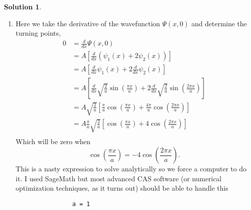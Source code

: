 \documentclass[10pt]{article}
\makeatletter
\theoremstyle{definition}
\newtheorem{soln}{Solution}
\newcommand{\boxspacing}{\kern\kvtcb@left@rule\kern\kvtcb@boxsep}
\newcommand{\prompt}[4]{
    \ttfamily\llap{{\color{#2}[#3]:\hspace{3pt}#4}}\vspace{-\baselineskip}
}
\makeatother
\begin{document}
\begin{soln}
\begin{enumerate}[label=(\alph*)]
\begin{center}
          \end{center}
    \item Here we take the derivative of the wavefunction $\Psi(x,0)$ and determine the turning points,
          \begin{align*}
            0 & =\frac{d}{dx}\Psi(x,0)                                                                                                                         \\
              & =A\left[\frac{d}{dx}(\psi_1(x)+2\psi_2(x))\right]                                                                                              \\
              & =A\left[\frac{d}{dx}\psi_1(x)+2\frac{d}{dx}\psi_2(x)\right]                                                                                    \\
              & =A\left[\frac{d}{dx}\sqrt{\frac{2}{a}}\sin\left(\frac{\pi x}{a}\right)+2\frac{d}{dx}\sqrt{\frac{2}{a}}\sin\left(\frac{2\pi x}{a}\right)\right] \\
              & =A\sqrt{\frac{2}{a}}\left[\frac{\pi}{a}\cos\left(\frac{\pi x}{a}\right)+\frac{4\pi}{a}\cos\left(\frac{2\pi x}{a}\right)\right]                 \\
              & =A\frac{\pi}{a}\sqrt{\frac{2}{a}}\left[\cos\left(\frac{\pi x}{a}\right)+4\cos\left(\frac{2\pi x}{a}\right)\right]                              \\
          \end{align*}
          Which will be zero when
          $$\cos\left(\frac{\pi x}{a}\right)=-4\cos\left(\frac{2\pi x}{a}\right).$$
          This is a nasty expression to solve analytically so we force a computer to do it. I used SageMath but most advanced
          CAS software (or numerical optimization techniques, as it turns out) should be able to handle this
          \begin{tcolorbox}[breakable, size=fbox, boxrule=1pt, pad at break*=1mm,colback=cellbackground, colframe=cellborder]
            \prompt{In}{incolor}{2}{\boxspacing}
            \begin{verbatim}
                a = 1

\end{verbatim}
\end{tcolorbox}
\end{enumerate}
\end{soln}
\end{document}

